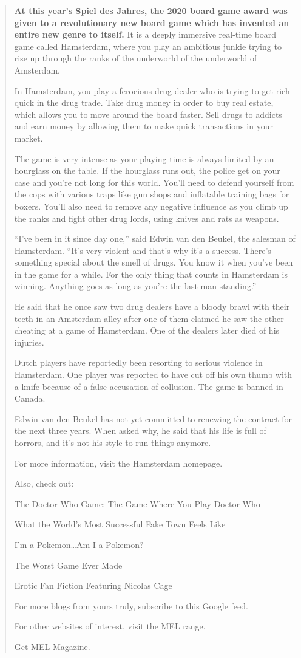 \begin{quote}
\textbf{At this year's Spiel des Jahres, the 2020 board game award was given to
a revolutionary new board game which has invented an entire new genre to
itself.} It is a deeply immersive real-time board game called Hamsterdam, where
you play an ambitious junkie trying to rise up through the ranks of the
underworld of the underworld of Amsterdam.

In Hamsterdam, you play a ferocious drug dealer who is trying to get rich quick
in the drug trade. Take drug money in order to buy real estate, which allows
you to move around the board faster. Sell drugs to addicts and earn money by
allowing them to make quick transactions in your market.

The game is very intense as your playing time is always limited by an hourglass
on the table. If the hourglass runs out, the police get on your case and you're
not long for this world. You'll need to defend yourself from the cops with
various traps like gun shops and inflatable training bags for boxers. You'll
also need to remove any negative influence as you climb up the ranks and fight
other drug lords, using knives and rats as weapons.

“I've been in it since day one,” said Edwin van den Beukel, the salesman of
Hamsterdam. “It's very violent and that's why it's a success. There's something
special about the smell of drugs. You know it when you've been in the game for
a while. For the only thing that counts in Hamsterdam is winning. Anything goes
as long as you're the last man standing.”

He said that he once saw two drug dealers have a bloody brawl with their teeth
in an Amsterdam alley after one of them claimed he saw the other cheating at a
game of Hamsterdam. One of the dealers later died of his injuries.

Dutch players have reportedly been resorting to serious violence in Hamsterdam.
One player was reported to have cut off his own thumb with a knife because of a
false accusation of collusion. The game is banned in Canada.

Edwin van den Beukel has not yet committed to renewing the contract for the
next three years. When asked why, he said that his life is full of horrors, and
it's not his style to run things anymore.

For more information, visit the Hamsterdam homepage.

Also, check out:

The Doctor Who Game: The Game Where You Play Doctor Who

What the World's Most Successful Fake Town Feels Like

I'm a Pokemon…Am I a Pokemon?

The Worst Game Ever Made

Erotic Fan Fiction Featuring Nicolas Cage

For more blogs from yours truly, subscribe to this Google feed.

For other websites of interest, visit the MEL range.

Get MEL Magazine.
\end{quote}

